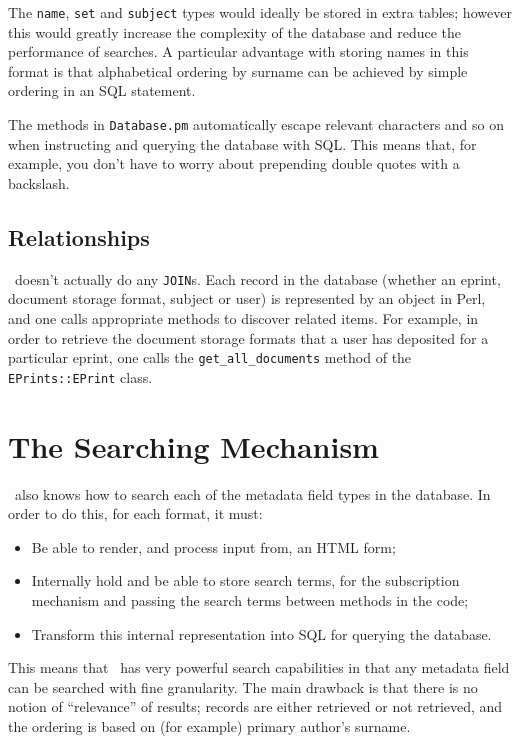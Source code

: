 The {\tt name}, {\tt set} and {\tt subject} types would ideally be stored in extra tables; however this would greatly increase the complexity of the database and reduce the performance of searches. A particular advantage with storing names in this format is that alphabetical ordering by surname can be achieved by simple ordering in an SQL statement.

The methods in {\tt Database.pm} automatically escape relevant characters and so on when instructing and querying the database with SQL. This means that, for example, you don't have to worry about prepending double quotes with a backslash.


\subsection{Relationships}

\eprints\ doesn't actually do any {\tt JOIN}s. Each record in the database (whether an eprint, document storage format, subject or user) is represented by an object in Perl, and one calls appropriate methods to discover related items. For example, in order to retrieve the document storage formats that a user has deposited for a particular eprint, one calls the {\tt get\_all\_documents} method of the {\tt EPrints::EPrint} class.



\section{The Searching Mechanism}

\eprints\ also knows how to search each of the metadata field types in the database. In order to do this, for each format, it must:

\begin{itemize}
\item Be able to render, and process input from, an HTML form;
\item Internally hold and be able to store search terms, for the subscription mechanism and passing the search terms between methods in the code;
\item Transform this internal representation into SQL for querying the database.
\end{itemize}

This means that \eprints\ has very powerful search capabilities in that any metadata field can be searched with fine granularity. The main drawback is that there is no notion of ``relevance'' of results; records are either retrieved or not retrieved, and the ordering is based on (for example) primary author's surname.

